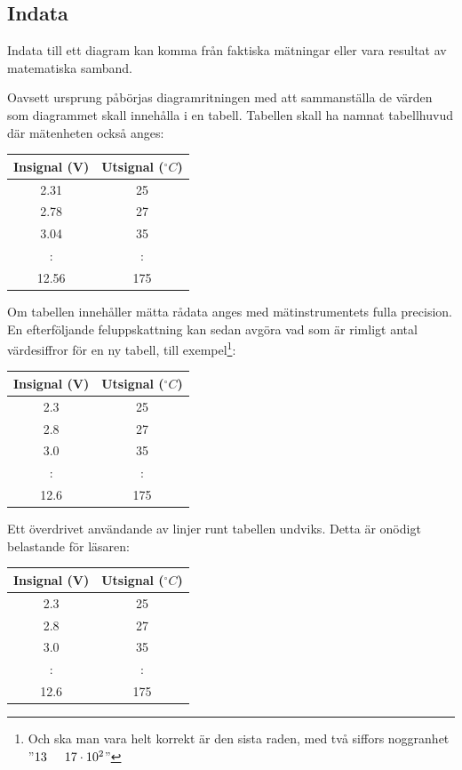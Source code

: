 \documentclass[onepage,swedish,a4paper,12pt]{scrbook}
\begin{document}
\subsection*{Indata}

Indata till ett diagram kan komma från faktiska mätningar eller vara resultat av matematiska samband.

Oavsett ursprung påbörjas diagramritningen med att sammanställa de värden som diagrammet skall innehålla i en tabell. Tabellen skall ha namnat tabellhuvud där mät\-enheten också anges:

\begin{center}
\begin{tabular}{cc}
Insignal (V) & Utsignal ($^\circ C$)\\
\hline
2.31 & 25\\
2.78 & 27\\
3.04 & 35\\
: & : \\
12.56 & 175\\
\hline
\end{tabular}
\end{center}

Om tabellen innehåller mätta rådata anges med mätinstrumentets fulla precision. En efterföljande feluppskattning kan sedan avgöra vad som är rimligt antal värdesiffror för en ny tabell, till exempel\footnote{Och ska man vara helt korrekt är den sista raden, med två siffors noggranhet ''$13 \hspace{5mm} 17\cdot10^2$''}:

\begin{center}
\begin{tabular}{cc}
Insignal (V) & Utsignal ($^\circ C$)\\
\hline
2.3 & 25\\
2.8 & 27\\
3.0 & 35\\
: & : \\
12.6 & 175\\
\hline
\end{tabular}
\end{center}

Ett överdrivet användande av linjer runt tabellen undviks. Detta är onödigt belastande för läsaren:

\begin{center}
\begin{tabular}{|c|c|}
\hline
Insignal (V) & Utsignal ($^\circ C$)\\
\hline
2.3 & 25\\
\hline
2.8 & 27\\
\hline
3.0 & 35\\
\hline
: & : \\
\hline
12.6 & 175\\
\hline
\end{tabular}
\end{center}
\end{document}
